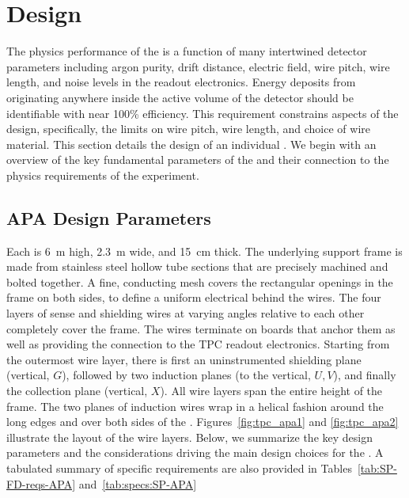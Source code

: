 \section{Design}
\label{sec:fdsp-apa-design}

The physics performance of the  is a function of many intertwined detector parameters including argon purity, drift distance, electric field, wire pitch, wire length, and noise levels in the readout electronics.  Energy deposits from  originating anywhere inside the active volume of the detector should be identifiable with near \num{100}\% efficiency.  This requirement constrains aspects of the  design, specifically, the limits on wire pitch, wire length, and choice of wire material.  This section details the design of an individual . We begin with an overview of the key fundamental parameters of the  and their connection to the physics requirements of the experiment. 


\subsection{APA Design Parameters}
\label{sec:fdsp-apa-design-overview}

Each  is \SI{6}{m} high, \SI{2.3}{m} wide, and \SI{15}{cm} thick.  The underlying support frame is made from stainless steel hollow tube sections that are precisely machined and bolted together. A fine, conducting mesh covers the rectangular openings in the frame on both sides, to define a uniform electrical  behind the wires. The four layers of sense and shielding wires at varying angles relative to each other completely cover the frame. The wires terminate on boards that anchor them as well as providing the connection to the TPC readout electronics. Starting from the outermost wire layer, there is first an uninstrumented shielding plane (vertical, $G$), followed by two induction planes (\apainducwireangle to the vertical, $U,V$), and finally the collection plane (vertical, $X$). All wire layers span the entire height of the  frame. The two planes of induction wires wrap in a helical fashion around the long edges and over both sides of the . Figures~\ref{fig:tpc_apa1} and \ref{fig:tpc_apa2} illustrate the layout of the wire layers.  Below, we summarize the key design parameters and the considerations driving the main design choices for the .  A tabulated summary of  specific requirements are also provided in Tables~\ref{tab:SP-FD-reqs-APA} and~\ref{tab:specs:SP-APA} %

